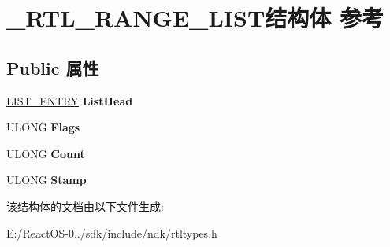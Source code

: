 \hypertarget{struct___r_t_l___r_a_n_g_e___l_i_s_t}{}\section{\+\_\+\+R\+T\+L\+\_\+\+R\+A\+N\+G\+E\+\_\+\+L\+I\+S\+T结构体 参考}
\label{struct___r_t_l___r_a_n_g_e___l_i_s_t}
\subsection*{Public 属性}
\begin{DoxyCompactItemize}
\item 
\mbox{\label{struct___r_t_l___r_a_n_g_e___l_i_s_t_a261bd8e117c9a863e40b6b1dadb58c1d}} 
\hyperlink{struct___l_i_s_t___e_n_t_r_y}{L\+I\+S\+T\+\_\+\+E\+N\+T\+RY} {\bfseries List\+Head}
\item 
\mbox{\label{struct___r_t_l___r_a_n_g_e___l_i_s_t_ae7aa890c056b16b2c6f1f4fd211b44e2}} 
U\+L\+O\+NG {\bfseries Flags}
\item 
\mbox{\label{struct___r_t_l___r_a_n_g_e___l_i_s_t_accd6cb90d749af3fc76674f2e62f45ea}} 
U\+L\+O\+NG {\bfseries Count}
\item 
\mbox{\label{struct___r_t_l___r_a_n_g_e___l_i_s_t_a21d4a96aa385b3f1c687a0292902db71}} 
U\+L\+O\+NG {\bfseries Stamp}
\end{DoxyCompactItemize}


该结构体的文档由以下文件生成\+:\begin{DoxyCompactItemize}
\item 
E\+:/\+React\+O\+S-\/0../sdk/include/ndk/rtltypes.\+h\end{DoxyCompactItemize}
